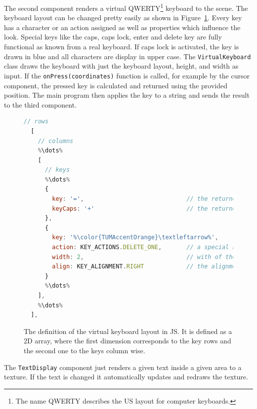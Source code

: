 The second component renders a virtual QWERTY\footnote{The name QWERTY describes the US layout for computer keyboards.} keyboard to the scene. The keyboard layout can be changed pretty easily as shown in Figure~\ref{fig:virtual-keyboard-layout}. Every key has a character or an action assigned as well as properties which influence the look. Special keys like the caps, caps lock, enter and delete key are fully functional as known from a real keyboard. If caps lock is activated, the key is drawn in blue and all characters are display in upper case. The \lstinline{VirtualKeyboard} class draws the keyboard with just the keyboard layout, height, and width as input. If the \lstinline{onPress(coordinates)} function is called, for example by the cursor component, the pressed key is calculated and returned using the provided position. The main program then applies the key to a string and sends the result to the third component. %

\begin{figure}[H]
  \begin{lstlisting}[language=JavaScript]
  // rows
  [
    // columns
    %\dots%
    [ 
      // keys
      %\dots%
      {
        key: '=',                             // the returned character if no action is present otherwise just a label
        keyCaps: '+'                          // the returned character if in caps mode 
      },
      {
        key: '%\color{TUMAccentOrange}\textleftarrow%',
        action: KEY_ACTIONS.DELETE_ONE,       // a special key action; in this case, it deletes the last character
        width: 2,                             // with of the key
        align: KEY_ALIGNMENT.RIGHT            // the alignment of the label on the key
      }
      %\dots%
    ],
    %\dots%
  ],
  \end{lstlisting}
  \caption[Virtual keyboard layout definition]{The definition of the virtual keyboard layout in \ac{JS}. It is defined as a \ac{2D} array, where the first dimension corresponds to the key rows and the second one to the keys column wise.}\label{fig:virtual-keyboard-layout}
\end{figure}

The \lstinline{TextDisplay} component just renders a given text inside a given area to a texture. If the text is changed it automatically updates and redraws the texture.